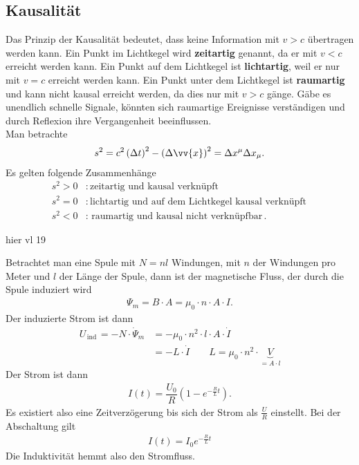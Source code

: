 \documentclass[a4paper,12pt]{article}
\begin{document}
\subsection{Kausalität}
Das Prinzip der Kausalität bedeutet, dass keine Information mit $v>c$ übertragen werden kann. Ein Punkt im Lichtkegel wird \textbf{zeitartig} genannt, da er mit $v<c$ erreicht werden kann. Ein Punkt auf dem Lichtkegel ist \textbf{lichtartig}, weil er nur mit $v=c$ erreicht werden kann. Ein Punkt unter dem Lichtkegel ist \textbf{raumartig} und kann nicht kausal erreicht werden, da dies nur mit $v>c$ gänge. Gäbe es unendlich schnelle Signale, könnten sich raumartige Ereignisse verständigen und durch Reflexion ihre Vergangenheit beeinflussen.\\\indent
Man betrachte
\begin{align*} 
        s^2=c^2\left(\Delta t\right)^2-\left(\Delta \vv{x}\right)^2=\Delta x^\mu \Delta x_\mu 
.\end{align*} 
Es gelten folgende Zusammenhänge
\begin{align*} 
        s^2>0&:\,\text{zeitartig und kausal verknüpft}\,\\
        s^2=0&:\,\text{lichtartig und auf dem Lichtkegel kausal verknüpft}\,\\
        s^2<0&:\,\text{raumartig und kausal nicht verknüpfbar}\,
.\end{align*} 

\newpage
hier vl 19%
\newpage

Betrachtet man eine Spule mit $N=nl$ Windungen, mit $n$ der Windungen pro Meter und $l$ der Länge der Spule, dann ist der magnetische Fluss, der durch die Spule induziert wird
\begin{align*} 
        \Psi _m=B\cdot A=\mu _0\cdot n\cdot A\cdot I
.\end{align*} 
Der induzierte Strom ist dann
\begin{align*} 
        U_{\,\text{ind}\,}=-N\cdot \dot{\Psi }_m&=-\mu _0\cdot n^2\cdot l\cdot A\cdot \dot{I}\\
        &=-L\cdot \dot{I}\qquad L=\mu _0\cdot n^2\cdot \underbrace{V}_{=A\cdot l}
\end{align*} 
Der Strom ist dann
\begin{align*} 
        I\left(t\right)=\dfrac{U_0}{R}\left(1-e ^{-\tfrac{R}{L}t}\right)
.\end{align*} 
Es existiert also eine Zeitverzögerung bis sich der Strom als $\tfrac{U}{R}$ einstellt. Bei der Abschaltung gilt
\begin{align*} 
        I\left(t\right)=I_0e ^{-\tfrac{R}{L}t}
\end{align*} 
Die Induktivität hemmt also den Stromfluss.
\end{document}
